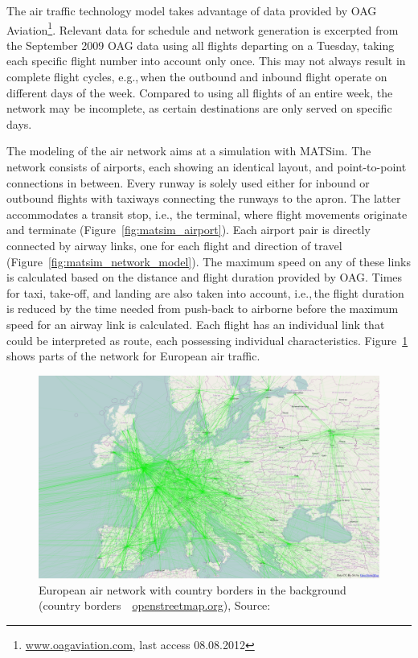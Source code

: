 The air traffic technology model takes advantage of data provided by OAG Aviation\footnote{\url{www.oagaviation.com}, last access 08.08.2012}. 
Relevant data for schedule and network generation is excerpted from the September 2009 OAG data using all flights departing on a Tuesday, taking each specific flight number into account only once.
This may not always result in complete flight cycles, e.g.,\,when the outbound and inbound flight operate on different days of the week. 
Compared to using all flights of an entire week, the network may be incomplete, as certain destinations are only served on specific days.


The modeling of the air network aims at a simulation with MATSim.  
The network consists of airports, each showing an identical layout, and point-to-point connections in between. 
Every runway is solely used either for inbound or outbound flights with taxiways connecting the runways to the apron. The latter accommodates a transit stop, i.e., the terminal, where flight movements originate and terminate (Figure~\ref{fig:matsim_airport}). 
Each airport pair is directly connected by airway links, one for each flight and direction of travel (Figure~\ref{fig:matsim_network_model}). 
The maximum speed on any of these links is calculated based on the distance and flight duration provided by OAG. 
Times for taxi, take-off, and landing are also taken into account, i.e.,\,the flight duration is reduced by the time needed from push-back to airborne before the maximum speed for an airway link is calculated.
Each flight has an individual link that could be interpreted as route, each possessing individual characteristics. 
Figure~\ref{fig:matsim_air_network_eu} shows parts of the network for European air traffic.

\begin{figure}[t]
\begin{center}
  \includegraphics[width=\linewidth]{extending/figures/air/air_network_europe_osm.png}
\end{center}
\caption[European air network]{European air network with country borders in the background (country borders~\textcopyright~\url{openstreetmap.org}), Source:~\citet{Grether2014PhD}}
  \label{fig:matsim_air_network_eu}
\end{figure}

